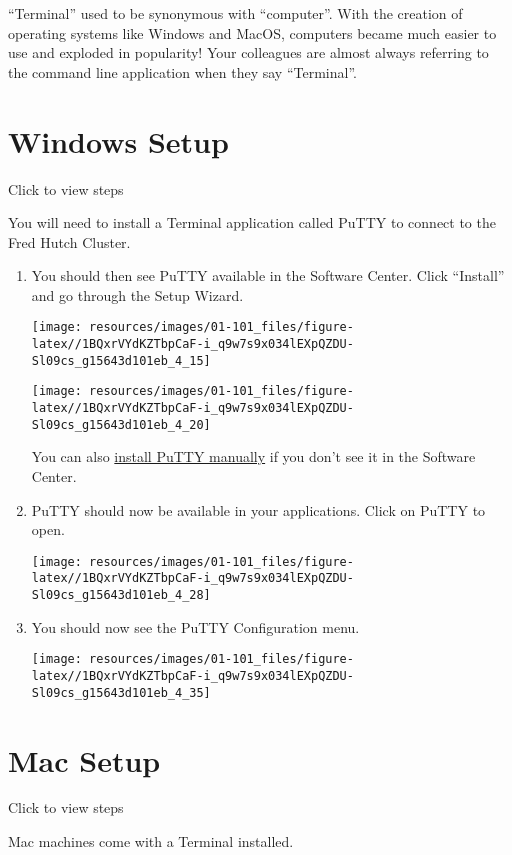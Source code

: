 \documentclass[
]{book}
\begin{document}
``Terminal'' used to be synonymous with ``computer''. With the creation of operating systems like Windows and MacOS, computers became much easier to use and exploded in popularity! Your colleagues are almost always referring to the command line application when they say ``Terminal''.

\hypertarget{windows}{%
\section{Windows Setup}\label{windows}}

Click to view steps

You will need to install a Terminal application called PuTTY to connect to the Fred Hutch Cluster.

\begin{enumerate}
\def\labelenumi{\arabic{enumi}.}
\item
  You should then see PuTTY available in the Software Center. Click ``Install'' and go through the Setup Wizard.

  \texttt{[image: resources/images/01-101\_files/figure-latex//1BQxrVYdKZTbpCaF-i\_q9w7s9x034lEXpQZDU-Sl09cs\_g15643d101eb\_4\_15]}

  \texttt{[image: resources/images/01-101\_files/figure-latex//1BQxrVYdKZTbpCaF-i\_q9w7s9x034lEXpQZDU-Sl09cs\_g15643d101eb\_4\_20]}

  You can also \href{faq.html\#manual-putty}{install PuTTY manually} if you don't see it in the Software Center.
\item
  PuTTY should now be available in your applications. Click on PuTTY to open.

  \texttt{[image: resources/images/01-101\_files/figure-latex//1BQxrVYdKZTbpCaF-i\_q9w7s9x034lEXpQZDU-Sl09cs\_g15643d101eb\_4\_28]}
\item
  You should now see the PuTTY Configuration menu.

  \texttt{[image: resources/images/01-101\_files/figure-latex//1BQxrVYdKZTbpCaF-i\_q9w7s9x034lEXpQZDU-Sl09cs\_g15643d101eb\_4\_35]}
\end{enumerate}

\hypertarget{mac}{%
\section{Mac Setup}\label{mac}}

Click to view steps

Mac machines come with a Terminal installed.
\end{document}
